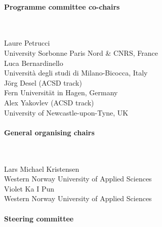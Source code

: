 \documentclass[10pt]{article}
\newcommand{\styleUniv}[1]{\textcolor{black!75}{#1}}
\begin{document}
\setlength{\columnsep}{0cm}
\begin{multicols}{2}
\paragraph{Programme committee co-chairs}$ $
\vspace*{0.25em}

\noindent Laure Petrucci \\
\indent \styleUniv{University Sorbonne Paris Nord \& CNRS, France} \\
\noindent Luca Bernardinello \\
\indent \styleUniv{Università degli studi di Milano-Bicocca, Italy} \\
\noindent Jörg Desel (ACSD track) \\
\indent \styleUniv{Fern Universität in Hagen, Germany} \\
\noindent Alex Yakovlev (ACSD track) \\
\indent \styleUniv{University of Newcastle-upon-Tyne, UK}


\paragraph*{General organising chairs}$ $

\vspace*{0.25em}
\noindent Lars Michael Kristensen \\
\indent \styleUniv{Western Norway University of Applied Sciences}\\
\noindent Violet Ka I Pun \\
\indent \styleUniv{Western Norway University of Applied Sciences}

\columnbreak

\paragraph{Steering committee}\mbox{}
\vspace*{0.25em}


\end{multicols}
\end{document}
